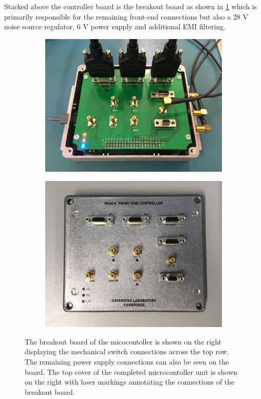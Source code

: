Stacked above the controller board is the breakout board as shown in \cref{fig:break_board} which is primarily responsible for the remaining front-end connections but also a 28 V noise source regulator, 6 V power supply and additional EMI filtering.
\begin{figure}
\centering
    \centering
    \begin{subfigure}{.5\textwidth}
        \centering
        \includegraphics[width=\linewidth]{ucon}
    \end{subfigure}
    \hfill
    \begin{subfigure}{.45\textwidth}
    \centering
        \includegraphics[width=\linewidth]{ucon_cover}
    \end{subfigure}
    \caption{The breakout board of the micocontoller is shown on the right displaying the mechanical switch connections across the top row. The remaining power supply connections can also be seen on the board. The top cover of the completed microcontoller unit is shown on the right with laser markings annotating the connections of the breakout board.}
    \label{fig:break_board}
\end{figure}
